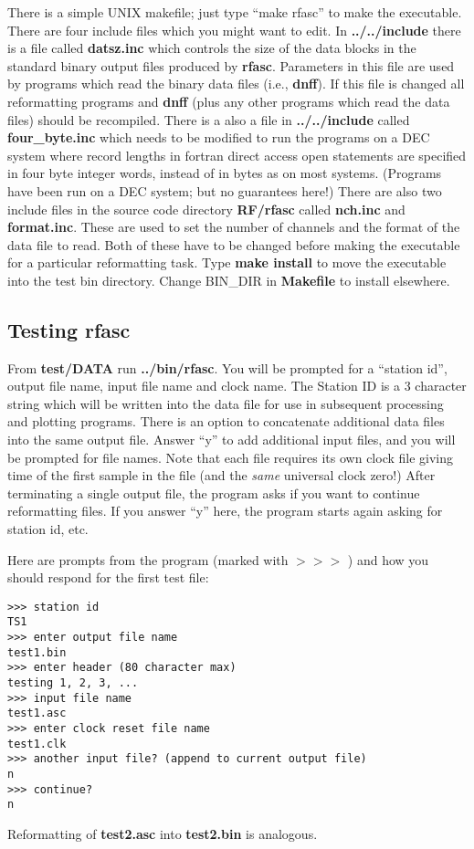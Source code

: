 There is a simple UNIX makefile; just type ``make rfasc''
to make the executable.  There are four include files
which you might want to edit.  In {\bf ../../include}
there is a file called {\bf datsz.inc} which controls the size of
the data blocks in the standard binary output files produced by 
{\bf rfasc}.  Parameters in this file are used by programs which
read the binary data files (i.e., {\bf dnff}).
If this file is changed all reformatting programs and 
{\bf dnff} (plus any other programs which read the data files)
should be recompiled.  There is a also a file in {\bf ../../include}
called {\bf four\_byte.inc} which needs to be modified to run the programs
on a DEC system where record lengths in fortran direct access open
statements are specified in four byte integer words, instead of in
bytes as on most systems.  
(Programs have been run on a DEC system; but no guarantees here!)
There are also two include files in 
the source code directory {\bf RF/rfasc} called {\bf nch.inc}
and {\bf format.inc}.  These are used to set the number of channels
and the format of the data file to read.  Both of these have to be
changed before making the executable for a particular reformatting task.
Type {\bf make install} to move the executable into the test bin 
directory.  Change BIN\_DIR in {\bf Makefile} to install elsewhere.

\subsection{Testing rfasc}

From {\bf test/DATA} run {\bf ../bin/rfasc}.
You will be prompted for a ``station id'',
output file name, input file name and clock name.
The Station ID is a 3 character string which will be
written into the data file for use in subsequent
processing and plotting programs.
There is an option to concatenate additional data
files into the same output file.  Answer 
``y'' to add additional input files, and you 
will be prompted for file names.
Note that each file requires its own clock file
giving time of the first sample in the file (and the {\it same} universal clock
zero!)  After terminating a single output file, the program asks
if you want to continue reformatting files.  If you
answer ``y'' here, the program starts again asking for station id, etc.

Here are prompts from the program (marked with $>>>$ )
and how you should respond
for the first test file:
\small
\begin{verbatim}
>>> station id
TS1
>>> enter output file name
test1.bin
>>> enter header (80 character max)
testing 1, 2, 3, ...
>>> input file name
test1.asc
>>> enter clock reset file name
test1.clk
>>> another input file? (append to current output file)
n
>>> continue?
n
\end{verbatim}
\normalsize
Reformatting of {\bf test2.asc} into {\bf test2.bin} is analogous.

